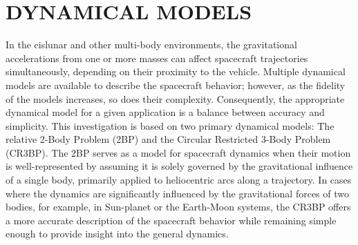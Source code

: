 \chapter{DYNAMICAL MODELS}

In the cislunar and other multi-body environments, the gravitational accelerations from one or more
masses can affect spacecraft trajectories simultaneously, depending on their proximity to the
vehicle. Multiple dynamical models are available to describe the spacecraft behavior; however, as
the fidelity of the models increases, so does their complexity. Consequently, the appropriate
dynamical model for a given application is a balance between accuracy and simplicity. This
investigation is based on two primary dynamical models: The relative 2-Body Problem (2BP) and the
Circular Restricted 3-Body Problem (CR3BP). The 2BP serves as a model for spacecraft dynamics when
their motion is well-represented by assuming it is solely governed by the gravitational influence
of a single body, primarily applied to heliocentric arcs along a trajectory. In cases where the
dynamics are significantly influenced by the gravitational forces of two bodies, for example, in
Sun-planet or the Earth-Moon systems, the CR3BP offers a more accurate description of the
spacecraft behavior while remaining simple enough to provide insight into the general dynamics.






